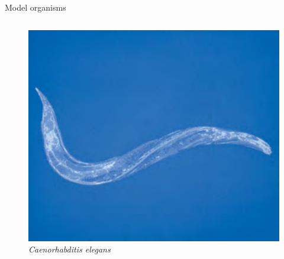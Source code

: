 \documentclass[11pt,ignorenonframetext,aspectratio=169]{beamer}
\begin{document}
\begin{frame}{Model organisms}
\begin{columns}[T,onlytextwidth]

\begin{figure}
\includegraphics[width=0.8\linewidth]{../images/model_organisms_elegans} \caption{\textit{Caenorhabditis elegans}}\label{fig:model-organisms-caenorhabditis}
\end{figure}

\end{columns}
\end{frame}
\end{document}
